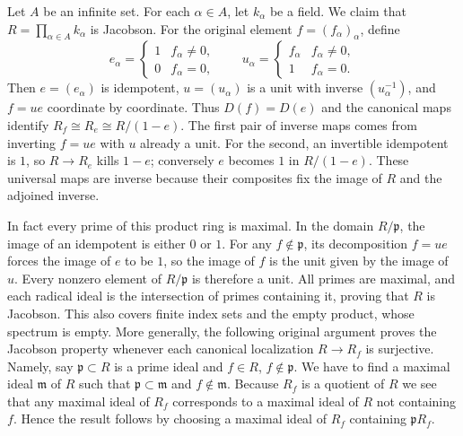 \begin{example}
\label{example-infinite-product-fields-jacobson}
Let $A$ be an infinite set.
For each $\alpha \in A$, let $k_\alpha$ be a field.
We claim that $R = \prod_{\alpha\in A} k_\alpha$ is Jacobson.
For the original element $f=(f_\alpha)_\alpha$, define
$$
e_\alpha=\begin{cases}1&f_\alpha\ne0,\\0&f_\alpha=0,\end{cases}
\qquad
u_\alpha=\begin{cases}f_\alpha&f_\alpha\ne0,\\1&f_\alpha=0.\end{cases}
$$
Then $e=(e_\alpha)$ is idempotent, $u=(u_\alpha)$ is a unit with
inverse $(u_\alpha^{-1})$, and $f=ue$ coordinate by coordinate.
Thus $D(f)=D(e)$ and the canonical maps identify
$R_f\cong R_e\cong R/(1-e)$. The first pair of inverse maps comes
from inverting $f=ue$ with $u$ already a unit. For the second, an
invertible idempotent is $1$, so $R\to R_e$ kills $1-e$; conversely
$e$ becomes $1$ in $R/(1-e)$. These universal maps are inverse
because their composites fix the image of $R$ and the adjoined inverse.

In fact every prime of this product ring is maximal. In the domain
$R/\mathfrak p$, the image of an idempotent is either $0$ or $1$.
For any $f\notin\mathfrak p$, its decomposition $f=ue$ forces the
image of $e$ to be $1$, so the image of $f$ is the unit given by
the image of $u$. Every nonzero element of $R/\mathfrak p$ is
therefore a unit. All primes are maximal, and each radical ideal
is the intersection of primes containing it, proving that $R$ is Jacobson.
This also covers finite index sets and the empty product, whose
spectrum is empty. More generally, the following original argument
proves the Jacobson property whenever each canonical localization
$R\to R_f$ is surjective.
Namely, say $\mathfrak p \subset R$ is a prime ideal
and $f \in R$, $f \not \in \mathfrak p$. We have to find
a maximal ideal $\mathfrak m$ of $R$ such that
$\mathfrak p \subset \mathfrak m$ and $f \not\in \mathfrak m$.
Because $R_f$ is a quotient of $R$ we see that any maximal
ideal of $R_f$ corresponds to a maximal ideal of $R$
not containing $f$. Hence the result follows
by choosing a maximal ideal of $R_f$ containing $\mathfrak p R_f$.
\end{example}
